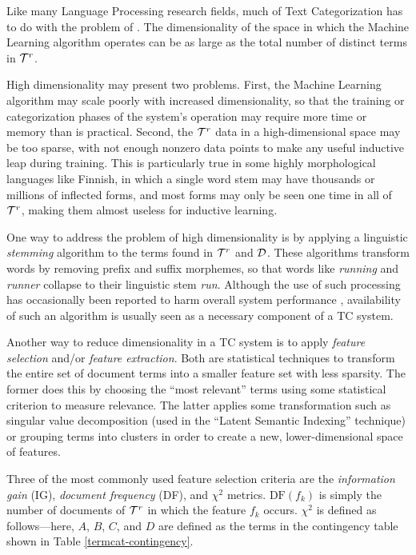 Like many Language Processing research fields, much of Text Categorization has
to do with the problem of .
\cite[p. 13]{sebastiani:02} \cite{joachims:98} The
dimensionality of the space in which the Machine Learning algorithm
operates can be as large as the total number of distinct terms in
$\mathcal{T}^r$.

High dimensionality may present two problems.  First, the Machine Learning
algorithm may scale poorly with increased dimensionality, so that
the training or categorization phases of the system's operation may
require more time or memory than is practical. \cite{chakrabarti:98} Second, the
$\mathcal{T}^r$ data in a high-dimensional space may be too sparse, with
not enough nonzero data points to make any useful inductive leap
during training.  This is particularly true in some highly
morphological languages like Finnish, in which a single word stem may
have thousands or millions of inflected forms, and most forms may only
be seen one time in all of $\mathcal{T}^r$, making them almost useless for
inductive learning.

One way to address the problem of high dimensionality is by applying a
linguistic \emph{stemming} algorithm to the terms found in $\mathcal{T}^r$
and $\mathcal{D}$.  These algorithms transform words by removing prefix and
suffix morphemes, so that words like \emph{running} and \emph{runner}
collapse to their linguistic stem \emph{run}.  Although the use of
such processing has occasionally been reported to harm overall system
performance \cite{baker:98}, availability of such an algorithm is
usually seen as a necessary component of a TC
system. \cite[p. 12]{sebastiani:02}

Another way to reduce dimensionality in a TC system is to apply
\emph{feature selection} and/or \emph{feature extraction}.  Both are
statistical techniques to transform the entire set of document terms
into a smaller feature set with less sparsity.  The former does this
by choosing the ``most relevant'' terms using some statistical
criterion to measure relevance.  The latter
applies some transformation such as singular value decomposition (used
in the ``Latent Semantic Indexing'' technique) or grouping terms into clusters in
order to create a new, lower-dimensional space of features.

Three of the most commonly used feature selection criteria are the
\emph{information gain} (IG), \emph{document frequency} (DF), and
\emph{$\chi^2$} metrics. \cite{yang:97} $\text{DF}(f_k)$ is simply the
number of documents of $\mathcal{T}^r$ in which the feature $f_k$ occurs.
$\chi^2$ is defined as follows---here, $A$, $B$, $C$, and $D$ are
defined as the terms in the contingency table shown in Table
\ref{termcat-contingency}.

